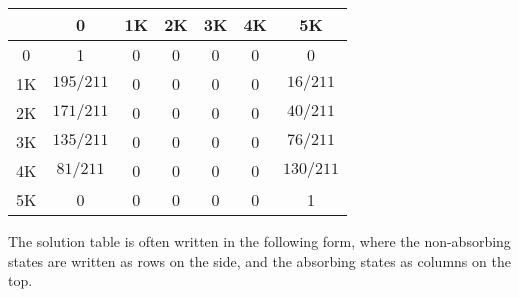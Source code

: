 \begin{center}
    \begin{tabular}{c|cccccc}
           & 0         & 1K & 2K & 3K & 4K & 5K        \\
        \hline
        0  & 1         & 0  & 0  & 0  & 0  & 0         \\
        1K & $195/211$ & 0  & 0  & 0  & 0  & $16/211$  \\
        2K & $171/211$ & 0  & 0  & 0  & 0  & $40/211$  \\
        3K & $135/211$ & 0  & 0  & 0  & 0  & $76/211$  \\
        4K & $81/211$  & 0  & 0  & 0  & 0  & $130/211$ \\
        5K & 0         & 0  & 0  & 0  & 0  & 1
    \end{tabular}

\end{center}

The solution table is often written in the following form, where the non-absorbing states are written as rows on the side, and the absorbing states as columns on the top.

